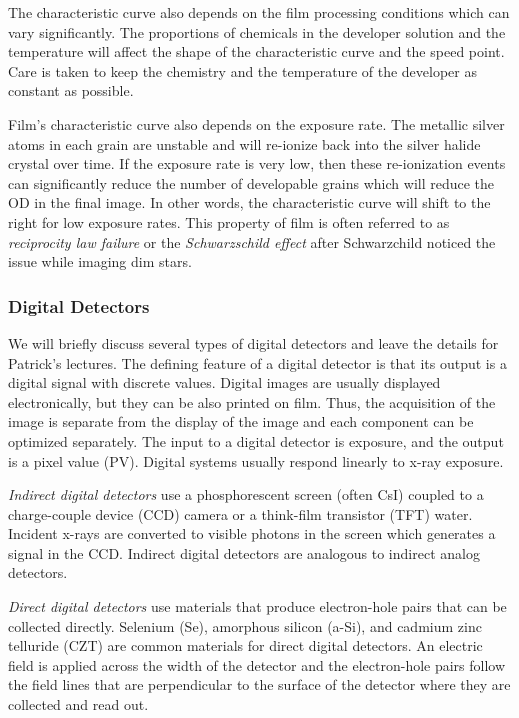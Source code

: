 \documentclass[mphy386-notes.tex]{subfiles}
\begin{document}
The characteristic curve also depends on the film processing conditions which
can vary significantly. The proportions of chemicals in the developer solution
and the temperature will affect the shape of the characteristic curve and the
speed point. Care is taken to keep the chemistry and the temperature of the
developer as constant as possible.

Film's characteristic curve also depends on the exposure rate. The metallic
silver atoms in each grain are unstable and will re-ionize back into the silver
halide crystal over time. If the exposure rate is very low, then these
re-ionization events can significantly reduce the number of developable grains
which will reduce the OD in the final image. In other words, the characteristic
curve will shift to the right for low exposure rates. This property of film is
often referred to as \textit{reciprocity law failure} or the
\textit{Schwarzschild effect} after Schwarzchild noticed the issue while imaging
dim stars.

\subsubsection*{Digital Detectors}
We will briefly discuss several types of digital detectors and leave the details
for Patrick's lectures. The defining feature of a digital detector is that its
output is a digital signal with discrete values. Digital images are usually
displayed electronically, but they can be also printed on film. Thus, the
acquisition of the image is separate from the display of the image and each
component can be optimized separately. The input to a digital detector is
exposure, and the output is a pixel value (PV). Digital systems usually respond
linearly to x-ray exposure.

\textit{Indirect digital detectors} use a phosphorescent screen (often CsI)
coupled to a charge-couple device (CCD) camera or a think-film transistor (TFT)
water. Incident x-rays are converted to visible photons in the screen which
generates a signal in the CCD. Indirect digital detectors are analogous to
indirect analog detectors.

\textit{Direct digital detectors} use materials that produce electron-hole pairs
that can be collected directly. Selenium (Se), amorphous silicon (a-Si), and
cadmium zinc telluride (CZT) are common materials for direct digital detectors.
An electric field is applied across the width of the detector and the
electron-hole pairs follow the field lines that are perpendicular to the surface
of the detector where they are collected and read out.
\end{document}
